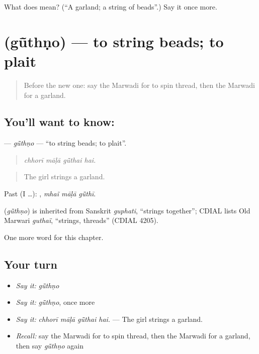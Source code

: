 \begin{tcolorbox}[breakable,colback=teal!4,colframe=teal!35!black,title={Before you move on}]
What does  mean? (\textquotedblleft{}A garland; a string of beads\textquotedblright{}.) Say it once more.
\end{tcolorbox}
\section[\texorpdfstring{\mw{गूंथणो} (gū̃thṇo)}{गूंथणो (gū̃thṇo)}]{ (gū̃thṇo) — to string beads; to plait}

\label{lesson:MW-C282-guthno}



\begin{quote}
Before the new one: say the Marwadi for to spin thread, then the Marwadi for a garland.
\end{quote}

\subsection*{You'll want to know: }
\textbf{} — \emph{gū̃thṇo} — \textquotedblleft{}to string beads; to plait\textquotedblright{}.

\begin{quote}
   
\end{quote}

\begin{quote}
\emph{chhorī māḷā gū̃thai hai.}
\end{quote}

\begin{quote}
The girl strings a garland.
\end{quote}

Past (I …):   , \emph{mhaĩ māḷā gū̃thī}.

\begin{cousinweb}
\textbf{} (\emph{gū̃thṇo}) is inherited from Sanskrit \emph{guphati}, \textquotedblleft{}strings together\textquotedblright{}; CDIAL lists Old Marwari \emph{guthaï}, \textquotedblleft{}strings, threads\textquotedblright{} (CDIAL 4205).
\end{cousinweb}

\begin{grammarlens}[title={What you've built}]
One more word for this chapter.
\end{grammarlens}

\subsection*{Your turn}
\begin{itemize}
\raggedright
  \item \emph{Say it:} \emph{gū̃thṇo}
  \item \emph{Say it:} \emph{gū̃thṇo}, once more
  \item \emph{Say it:} \emph{chhorī māḷā gū̃thai hai.} — The girl strings a garland.
  \item \emph{Recall:} say the Marwadi for to spin thread, then the Marwadi for a garland, then say \emph{gū̃thṇo} again
\end{itemize}

